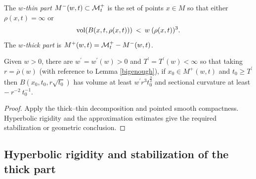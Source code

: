 \begin{definition}
  \label{def:kl-thick-thin-decomposition-thick-thin-decomposition}

The {\em $w$-thin part} $M^-(w, t) \subset {\mathcal M}_t^+$ is the set of points
$x \in M$ so that either $\rho(x,t)=\infty$ or
\begin{equation}
\operatorname{vol}(B(x, t, \rho(x, t))) \: < \: w \:
(\rho(x, t))^3.
\end{equation}
The {\em $w$-thick part} is $M^+(w, t) = {\mathcal M}_t^+  - M^-(w, t)$.
\end{definition}

\begin{lemma}
  \label{lem:kl-thick-thin-decomposition-existence-thick-thin-geometry}
 \label{applies}
Given $w > 0$, there are
$w^\prime = w^\prime(w) > 0$ and $T^\prime = T^\prime(w) < \infty$ so that
taking $r = \overline{\rho}(w)$
(with reference to Lemma \ref{bigenough}),
if $x_0 \in M^+(w,t)$ and $t_0 \ge T^\prime$ then
$B(x_0, t_0, r\sqrt{t_0})$ has volume at least $w^\prime r^3 t_0^{\frac32}$ and
sectional curvature at least $- \: r^{-2} \: t_0^{-1}$.
\end{lemma}

\begin{proof}
\sketch Apply the thick--thin decomposition and pointed smooth compactness. Hyperbolic rigidity and the approximation estimates give the required stabilization or geometric conclusion.
\end{proof}

\subsection{Hyperbolic rigidity and stabilization of the thick part}
\label{hyprig}

